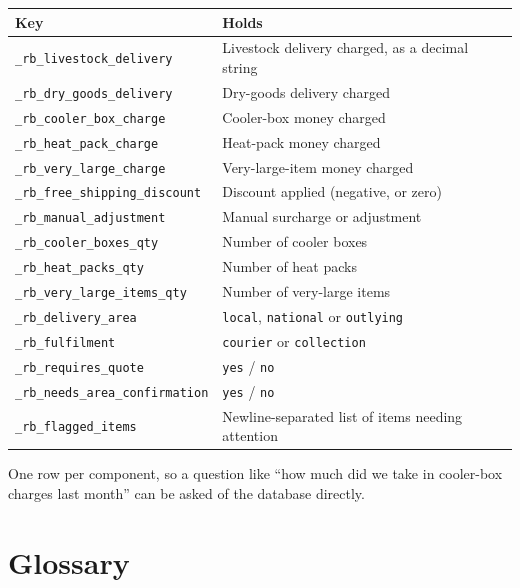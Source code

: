 \documentclass[11pt,a4paper,oneside]{report}
\newcommand{\opt}[1]{\texttt{\small #1}}
\begin{document}
\begin{longtable}{@{}L{6.4cm}L{8.4cm}@{}}
\toprule
\textbf{Key} & \textbf{Holds}\\
\midrule
\endhead
\opt{\_rb\_livestock\_delivery} & Livestock delivery charged, as a decimal string\\
\opt{\_rb\_dry\_goods\_delivery} & Dry-goods delivery charged\\
\opt{\_rb\_cooler\_box\_charge} & Cooler-box money charged\\
\opt{\_rb\_heat\_pack\_charge} & Heat-pack money charged\\
\opt{\_rb\_very\_large\_charge} & Very-large-item money charged\\
\opt{\_rb\_free\_shipping\_discount} & Discount applied (negative, or zero)\\
\opt{\_rb\_manual\_adjustment} & Manual surcharge or adjustment\\
\addlinespace
\opt{\_rb\_cooler\_boxes\_qty} & Number of cooler boxes\\
\opt{\_rb\_heat\_packs\_qty} & Number of heat packs\\
\opt{\_rb\_very\_large\_items\_qty} & Number of very-large items\\
\addlinespace
\opt{\_rb\_delivery\_area} & \opt{local}, \opt{national} or \opt{outlying}\\
\opt{\_rb\_fulfilment} & \opt{courier} or \opt{collection}\\
\opt{\_rb\_requires\_quote} & \opt{yes} / \opt{no}\\
\opt{\_rb\_needs\_area\_confirmation} & \opt{yes} / \opt{no}\\
\opt{\_rb\_flagged\_items} & Newline-separated list of items needing attention\\
\bottomrule
\end{longtable}

One row per component, so a question like ``how much did we take in cooler-box charges
last month'' can be asked of the database directly.

\chapter{Glossary}
\end{document}
